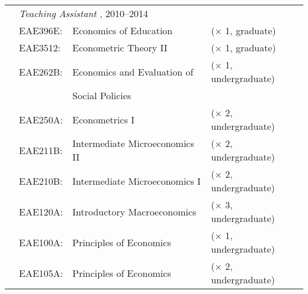 \begin{tabular}{llll}
	  
	  \indent
	&
	\multicolumn{3}{l}{
		\textit{%
			Teaching Assistant%
		}%
		,
		2010--2014
	}
	\\[.5ex]
	
	& EAE396E:
	& Economics of Education
	& ($\times$ 1, graduate)
	\\%
	
	& EAE3512:
	& Econometric Theory II
	& ($\times$ 1, graduate)
	\\%
	
	& EAE262B:
	& Economics and Evaluation of
	& ($\times$ 1, undergraduate)
	\\%
	
	& 
	& Social Policies
	& 
	\\%
	
	& EAE250A:
	& Econometrics I
	& ($\times$ 2, undergraduate)
	\\%
	
	& EAE211B:
	& Intermediate Microeconomics II
	& ($\times$ 2, undergraduate)
	\\%
	
	& EAE210B:
	& Intermediate Microeconomics I
	& ($\times$ 2, undergraduate)
	\\%
	
	& EAE120A:
	& Introductory Macroeconomics
	& ($\times$ 3, undergraduate)
	\\%
	
	& EAE100A:
	& Principles of Economics
	& ($\times$ 1, undergraduate)
	\\%
	
	& EAE105A:
	& Principles of Economics
	& ($\times$ 2, undergraduate)
	\\%
	
\end{tabular}


